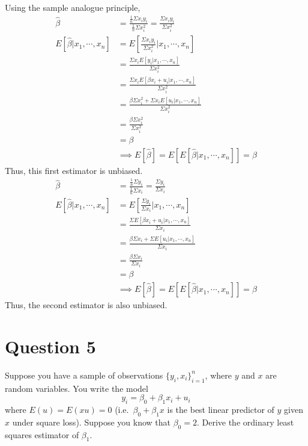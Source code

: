 \documentclass[
]{article}
\begin{document}
\begin{enumerate}
\begin{enumerate}
Using the sample analogue principle, 
\[\begin{aligned} 
\hat{\beta} &= \frac{\frac{1}{n}\Sigma x_iy_i}{\frac{1}{n}\Sigma x_i^2} = \frac{\Sigma x_iy_i}{\Sigma x_i^2}\\
E[\hat{\beta}|x_1, \cdots, x_n] &= E[\frac{\Sigma x_iy_i}{\Sigma x_i^2}|x_1, \cdots, x_n]\\ 
&= \frac{\Sigma x_i E[y_i|x_1, \cdots, x_n]}{\Sigma x_i^2}\\
&= \frac{\Sigma x_i E[\beta x_i + u_i|x_1, \cdots, x_n]}{\Sigma x_i^2} \\
&= \frac{\beta \Sigma x_i ^2  + \Sigma x_iE[u_i|x_1, \cdots, x_n]}{\Sigma x_i^2} \\
&= \frac{\beta \Sigma x_i ^2}{\Sigma x_i^2}\\ 
&= \beta  \\
&\implies E[\hat{\beta}] = E[E[\hat{\beta} | x_1, \cdots, x_n]] = \beta
\end{aligned}\]
Thus, this first estimator is unbiased. 
\[\begin{aligned} 
\hat{\beta} &= \frac{\frac{1}{n}\Sigma y_i}{\frac{1}{n}\Sigma x_i} =  \frac{\Sigma y_i}{\Sigma x_i} \\
E[\hat{\beta}|x_1, \cdots, x_n] &= E[\frac{\Sigma y_i}{\Sigma x_i}|x_1, \cdots, x_n]\\ 
&= \frac{\Sigma E[\beta x_i + u_i|x_1, \cdots, x_n]}{\Sigma x_i}\\
&= \frac{\beta \Sigma x_i  + \Sigma E[u_i|x_1, \cdots, x_n]}{\Sigma x_i} \\
&= \frac{\beta \Sigma x_i}{\Sigma x_i}\\ 
&= \beta \\
&\implies E[\hat{\beta}] = E[E[\hat{\beta} | x_1, \cdots, x_n]] = \beta
\end{aligned}\]
Thus, the second estimator is also unbiased. 

\end{enumerate}
\end{enumerate}

\hypertarget{question-5}{%
\section{Question 5}\label{question-5}}

Suppose you have a sample of observations \(\{y_i,x_i\}^n_{i=1}\), where
\(y\) and \(x\) are random variables. You write the model
\[y_i = \beta_0 + \beta_1 x_i + u_i\] where \(E (u) = E (xu) = 0\)
(i.e.~\(\beta_0 + \beta_1 x\) is the best linear predictor of \(y\)
given \(x\) under square loss). Suppose you know that \(\beta_0 = 2\).
Derive the ordinary least squares estimator of \(\beta_1\).
\end{document}
